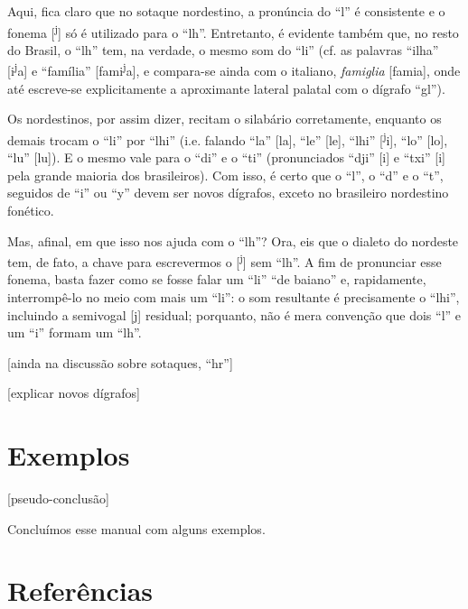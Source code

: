 \documentclass[12pt, a5paper, titlepage]{article}
\begin{document}
Aqui, fica claro que no sotaque nordestino, a pronúncia do ``l'' é consistente e o fonema [\textsuperscript{j}] só é utilizado para o ``lh''. Entretanto, é evidente também que, no resto do Brasil, o ``lh'' tem, na verdade, o mesmo som do ``li'' (cf. as palavras ``ilha'' [\textprimstress i\textsuperscript{j}a] e ``família'' [fa\textprimstress mi\textsuperscript{j}a], e compara-se ainda com o italiano, \textit{famiglia} [fa\textprimstress mi\textturny a], onde até escreve-se explicitamente a aproximante lateral palatal com o dígrafo ``gl'').

Os nordestinos, por assim dizer, recitam o silabário corretamente, enquanto os demais trocam o ``li'' por ``lhi'' (i.e. falando ``la'' [la], ``le'' [le], ``lhi'' [\textsuperscript{j}i], ``lo'' [lo], ``lu'' [lu]). E o mesmo vale para o ``di'' e o ``ti'' (pronunciados ``dji'' [i] e ``txi'' [i] pela grande maioria dos brasileiros). Com isso, é certo que o ``l'', o ``d'' e o ``t'', seguidos de ``i'' ou ``y'' devem ser novos dígrafos, exceto no brasileiro nordestino fonético.

Mas, afinal, em que isso nos ajuda com o ``lh''? Ora, eis que o dialeto do nordeste tem, de fato, a chave para escrevermos o [\textsuperscript{j}] sem ``lh''. A fim de pronunciar esse fonema, basta fazer como se fosse falar um ``li'' ``de baiano'' e, rapidamente, interrompê-lo no meio com mais um ``li'': o som resultante é precisamente o ``lhi'', incluindo a semivogal [j] residual; porquanto, não é mera convenção que dois ``l'' e um ``i'' formam um ``lh''.

[ainda na discussão sobre sotaques, ``hr'']

[explicar novos dígrafos]


\section{Exemplos}
 [pseudo-conclusão]

Concluímos esse manual com alguns exemplos.

\newpage
\section*{Referências}
\end{document}
